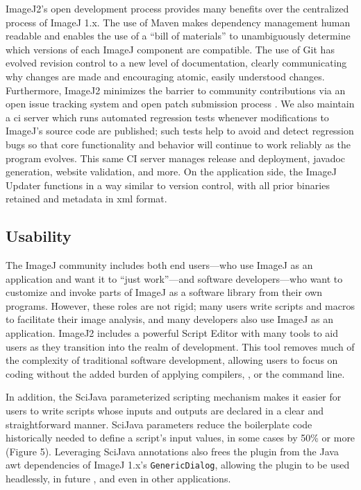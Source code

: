 \documentclass{bmcart}
\begin{document}
ImageJ2's open development process provides many benefits over the centralized
process of ImageJ 1.x. The use of Maven makes dependency management human
readable and enables the use of a ``bill of materials'' to unambiguously
determine which versions of each ImageJ component are compatible. The use of
Git has evolved revision control to a new level of documentation, clearly
communicating why changes are made and encouraging atomic, easily understood
changes. Furthermore, ImageJ2 minimizes the barrier to community contributions
via an open issue tracking system \cite{imagej_issues} and open patch
submission process \cite{imagej_contributing}. We also maintain a \acrfull{ci}
server \cite{imagej_jenkins} which runs automated regression tests whenever
modifications to ImageJ's source code are published; such tests help to avoid
and detect regression bugs so that core functionality and behavior will
continue to work reliably as the program evolves. This same CI server manages
release and deployment, javadoc generation, website validation, and more. On
the application side, the ImageJ Updater functions in a way similar to version
control, with all prior binaries retained and metadata in \acrshort{xml}
format.

\subsection*{Usability}

The ImageJ community includes both end users---who use ImageJ as an application
and want it to ``just work''---and software developers---who want to customize
and invoke parts of ImageJ as a software library from their own programs.
However, these roles are not rigid; many users write scripts and macros to
facilitate their image analysis, and many developers also use ImageJ as an
application. ImageJ2 includes a powerful Script Editor with many tools to aid
users as they transition into the realm of development. This tool removes much
of the complexity of traditional software development, allowing users to focus
on coding without the added burden of applying compilers, , or
the command line.

In addition, the SciJava parameterized scripting mechanism makes it easier for
users to write scripts whose inputs and outputs are declared in a clear and
straightforward manner. SciJava parameters reduce the boilerplate code
historically needed to define a script's input values, in some cases by 50\% or
more (Figure 5). Leveraging SciJava annotations also frees the plugin from the
Java \acrshort{awt} dependencies of ImageJ 1.x's \texttt{GenericDialog},
allowing the plugin to be used headlessly, in future , and even
in other applications.
\end{document}
